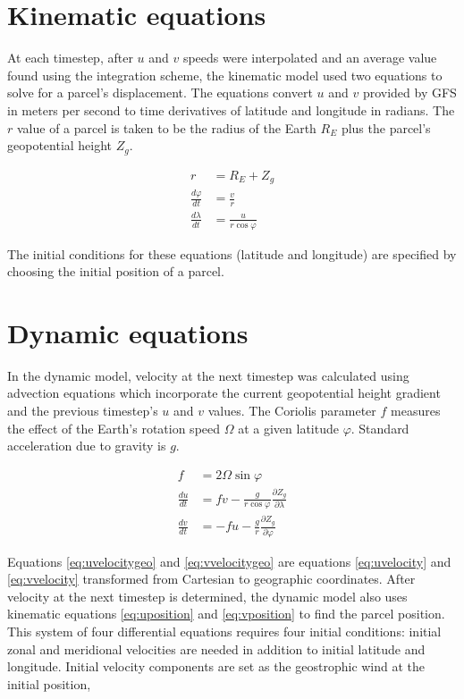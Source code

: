 \section{Kinematic equations}
At each timestep, after $u$ and $v$ speeds were interpolated and an average value found using the integration scheme, the kinematic model used two equations to solve for a parcel's displacement. 
The equations convert $u$ and $v$ provided by GFS in meters per second to time derivatives of latitude and longitude in radians.
The $r$ value of a parcel is taken to be the radius of the Earth $R_E$ plus the parcel's geopotential height $Z_g$.

\begin{align}
    r &= R_E + Z_g \\[2ex]
    \frac{d \varphi}{dt} &= \frac{v}{r} \label{eq:uposition} \\
    \frac{d \lambda}{dt} &= \frac{u}{r \cos{\varphi}} \label{eq:vposition}
\end{align}

The initial conditions for these equations (latitude and longitude) are specified by choosing the initial position of a parcel.

\section{Dynamic equations}
In the dynamic model, velocity at the next timestep was calculated using advection equations which incorporate the current geopotential height gradient and the previous timestep's $u$ and $v$ values.
The Coriolis parameter $f$ measures the effect of the Earth's rotation speed $\Omega$ at a given latitude $\varphi$.
Standard acceleration due to gravity is $g$. 

\begin{align}
    f &= 2 \Omega \sin{\varphi} \\[2ex]
    \frac{du}{dt} &= fv - \frac{g}{r \cos{\varphi}} \frac{\partial Z_g}{\partial \lambda} \label{eq:uvelocitygeo}\\
    \frac{dv}{dt} &= -fu -\frac{g}{r} \frac{\partial Z_g}{\partial \varphi} \label{eq:vvelocitygeo}
\end{align}

Equations \ref{eq:uvelocitygeo} and \ref{eq:vvelocitygeo} are equations \ref{eq:uvelocity} and \ref{eq:vvelocity} transformed from Cartesian to geographic coordinates. 
After velocity at the next timestep is determined, the dynamic model also uses kinematic equations \ref{eq:uposition} and \ref{eq:vposition} to find the parcel position.
This system of four differential equations requires four initial conditions: initial zonal and meridional velocities are needed in addition to initial latitude and longitude.
Initial velocity components are set as the geostrophic wind at the initial position,

